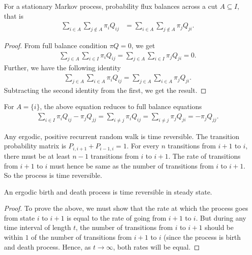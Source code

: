 \documentclass[a4paper,10pt,english]{article}
\begin{document}
\begin{lem} For a stationary Markov process, probability flux balances across a cut $A \subseteq I$, that is
\begin{align*}
\sum_{i \in A}\sum_{j \notin A} \pi_iQ_{ij} &= \sum_{i \in A}\sum_{j \notin A} \pi_jQ_{ji}.
\end{align*}
\end{lem}
\begin{proof} From full balance condition $\pi Q = 0$, we get
\begin{align*}
\sum_{j \in A}\sum_{i \in I}\pi_iQ_{ij} = \sum_{j \in A}\sum_{i \in I}\pi_j Q_{ji} = 0.
\end{align*}
Further, we have the following identity
\begin{align*}
\sum_{j \in A}\sum_{i \in A}\pi_iQ_{ij} = \sum_{j \in A}\sum_{i \in A}\pi_j Q_{ji}.
\end{align*}
Subtracting the second identity from the first, we get the result.
\end{proof}
\begin{rem} For $A= \{i\}$, the above equation reduces to full balance equations
\begin{align*}
\sum_{i \in I}\pi_i Q_{ij} - \pi_jQ_{jj} = \sum_{i \neq j}\pi_iQ_{ij} = \sum_{i \neq j}\pi_j Q_{ji} = -\pi_jQ_{jj}.
\end{align*}
\end{rem}


\begin{exmp} Any ergodic, positive recurrent random walk is time reversible. The transition probability matrix is $P_{i,i+1}+P_{i-1,i}=1$. For every $n$ transitions from $i+1$ to $i$, there must be at least $n-1$ transitions from $i$ to $i+1$. The rate of transitions from $i+1$ to $i$ must hence be same as the number of transitions from $i$ to $i+1$. So the process is time reversible.
\end{exmp}

\begin{prop}
An ergodic birth and death process is time reversible in steady state.
\end{prop}
\begin{proof}
To prove the above, we must show that the rate at which the process goes from state $i$ to $i+1$ is equal to the rate of going from $i+1$ to $i$. But during any time interval of length $t$, the number of transitions from $i$ to $i+1$ should be within $1$ of the number of transitions from $i+1$ to $i$ (since the process is birth and death process. Hence, as $t \rightarrow \infty$,  both rates will be equal. 
\end{proof}
\end{document}
